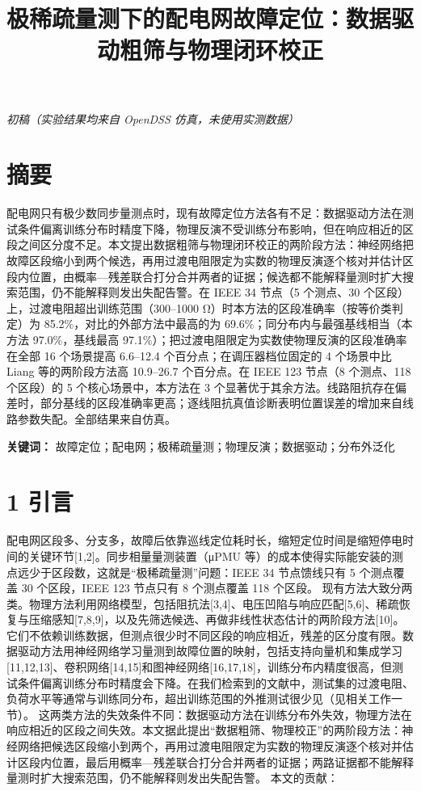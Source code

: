 \documentclass[
  11pt,
]{ctexart}
\title{极稀疏量测下的配电网故障定位：数据驱动粗筛与物理闭环校正}
\author{}
\date{}
\begin{document}
\maketitle

\emph{初稿（实验结果均来自 OpenDSS 仿真，未使用实测数据）}

\hypertarget{ux6458ux8981}{%
\section{摘要}\label{ux6458ux8981}}

配电网只有极少数同步量测点时，现有故障定位方法各有不足：数据驱动方法在测试条件偏离训练分布时精度下降，物理反演不受训练分布影响，但在响应相近的区段之间区分度不足。本文提出数据粗筛与物理闭环校正的两阶段方法：神经网络把故障区段缩小到两个候选，再用过渡电阻限定为实数的物理反演逐个核对并估计区段内位置，由概率---残差联合打分合并两者的证据；候选都不能解释量测时扩大搜索范围，仍不能解释则发出失配告警。在
IEEE 34 节点（5 个测点、30 个区段）上，过渡电阻超出训练范围（300--1000
Ω）时本方法的区段准确率（按等价类判定）为
85.2\%，对比的外部方法中最高的为 69.6\%；同分布内与最强基线相当（本方法
97.0\%，基线最高
97.1\%）；把过渡电阻限定为实数使物理反演的区段准确率在全部 16 个场景提高
6.6--12.4 个百分点；在调压器档位固定的 4 个场景中比 Liang
等的两阶段方法高 10.9--26.7 个百分点。在 IEEE 123 节点（8 个测点、118
个区段）的 5 个核心场景中，本方法在 3
个显著优于其余方法。线路阻抗存在偏差时，部分基线的区段准确率更高；逐线阻抗真值诊断表明位置误差的增加来自线路参数失配。全部结果来自仿真。

\textbf{关键词：}
故障定位；配电网；极稀疏量测；物理反演；数据驱动；分布外泛化

\hypertarget{ux5f15ux8a00}{%
\section{1 引言}\label{ux5f15ux8a00}}

配电网区段多、分支多，故障后依靠巡线定位耗时长，缩短定位时间是缩短停电时间的关键环节{[}1,2{]}。同步相量量测装置（μPMU
等）的成本使得实际能安装的测点远少于区段数，这就是``极稀疏量测''问题：IEEE
34 节点馈线只有 5 个测点覆盖 30 个区段，IEEE 123 节点只有 8 个测点覆盖
118 个区段。
现有方法大致分两类。物理方法利用网络模型，包括阻抗法{[}3,4{]}、电压凹陷与响应匹配{[}5,6{]}、稀疏恢复与压缩感知{[}7,8,9{]}，以及先筛选候选、再做非线性状态估计的两阶段方法{[}10{]}。它们不依赖训练数据，但测点很少时不同区段的响应相近，残差的区分度有限。数据驱动方法用神经网络学习量测到故障位置的映射，包括支持向量机和集成学习{[}11,12,13{]}、卷积网络{[}14,15{]}和图神经网络{[}16,17,18{]}，训练分布内精度很高，但测试条件偏离训练分布时精度会下降。在我们检索到的文献中，测试集的过渡电阻、负荷水平等通常与训练同分布，超出训练范围的外推测试很少见（见相关工作一节）。
这两类方法的失效条件不同：数据驱动方法在训练分布外失效，物理方法在响应相近的区段之间失效。本文据此提出``数据粗筛、物理校正''的两阶段方法：神经网络把候选区段缩小到两个，再用过渡电阻限定为实数的物理反演逐个核对并估计区段内位置，最后用概率---残差联合打分合并两者的证据；两路证据都不能解释量测时扩大搜索范围，仍不能解释则发出失配告警。
本文的贡献：
\end{document}
